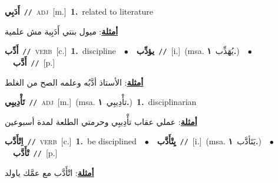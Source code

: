 \documentclass[10pt,a4paper,twoside]{article} %
\begin{document}
\begin{multicols}{2}
{{{{{{{{{{{\setlength\topsep{0pt}\textbf{\foreignlanguage{arabic}{أَدَبِي}}\ {\color{gray}\texttt{//}\color{black}}\ \textsc{adj}\ [m.]\ \textbf{1.}~related to literature\  \begin{flushright}\color{gray}\foreignlanguage{arabic}{\textbf{\underline{\foreignlanguage{arabic}{أمثلة}}}: ميول بنتي أَدَبِية مش علمية}\end{flushright}\color{black}} \vspace{2mm}

{\setlength\topsep{0pt}\textbf{\foreignlanguage{arabic}{أَدِّب}}\ {\color{gray}\texttt{//}\color{black}}\ \textsc{verb}\ [c.]\ \textbf{1.}~discipline\ \ $\bullet$\ \ \setlength\topsep{0pt}\textbf{\foreignlanguage{arabic}{يؤدِّب}}\ {\color{gray}\texttt{//}\color{black}}\ [i.]\ \color{gray}(msa. \foreignlanguage{arabic}{يُهَذِّب}~\foreignlanguage{arabic}{\textbf{١.}})\color{black}\ \ $\bullet$\ \ \setlength\topsep{0pt}\textbf{\foreignlanguage{arabic}{أَدَّب}}\ {\color{gray}\texttt{//}\color{black}}\ [p.]\  \begin{flushright}\color{gray}\foreignlanguage{arabic}{\textbf{\underline{\foreignlanguage{arabic}{أمثلة}}}: الأستاذ أدَّبُه وعلمه الصح من الغلط}\end{flushright}\color{black}} \vspace{2mm}

{\setlength\topsep{0pt}\textbf{\foreignlanguage{arabic}{تَأْدِيبِي}}\ {\color{gray}\texttt{//}\color{black}}\ \textsc{adj}\ [m.]\ \color{gray}(msa. \foreignlanguage{arabic}{تأْدِيبِي}~\foreignlanguage{arabic}{\textbf{١.}})\color{black}\ \textbf{1.}~disciplinarian\  \begin{flushright}\color{gray}\foreignlanguage{arabic}{\textbf{\underline{\foreignlanguage{arabic}{أمثلة}}}: عملي عقاب تأْدِيبِي وحرمتي الطلعة لمدة أسبوعين}\end{flushright}\color{black}} \vspace{2mm}

{\setlength\topsep{0pt}\textbf{\foreignlanguage{arabic}{اِتْأَدَّب}}\ {\color{gray}\texttt{//}\color{black}}\ \textsc{verb}\ [c.]\ \textbf{1.}~be disciplined\ \ $\bullet$\ \ \setlength\topsep{0pt}\textbf{\foreignlanguage{arabic}{يِتْأَدَّب}}\ {\color{gray}\texttt{//}\color{black}}\ [i.]\ \color{gray}(msa. \foreignlanguage{arabic}{يَتَأدَّب}~\foreignlanguage{arabic}{\textbf{١.}})\color{black}\ \ $\bullet$\ \ \setlength\topsep{0pt}\textbf{\foreignlanguage{arabic}{تْأَدَّب}}\ {\color{gray}\texttt{//}\color{black}}\ [p.]\  \begin{flushright}\color{gray}\foreignlanguage{arabic}{\textbf{\underline{\foreignlanguage{arabic}{أمثلة}}}: اتْأَدَّب مع عمَّك ياولد}\end{flushright}\color{black}} \vspace{2mm}

}}}}}}}}}}
\end{multicols}
\end{document}
